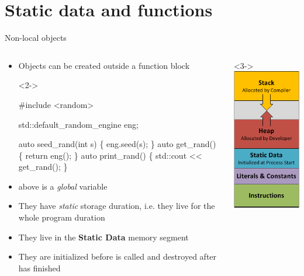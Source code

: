 

\section{Static data and functions}

\begin{frame}[fragile]{Non-local objects}

  \begin{columns}
    \begin{column}{.75\textwidth}
      \begin{itemize}
      \item Objects can be created outside a function block
        \begin{codeblock}<2->{
#include <random>

std::default_random_engine eng;

auto seed_rand(int s) \{ eng.seed(s); \}
auto get_rand()       \{ return eng(); \}
auto print_rand()     \{ std::cout << get_rand(); \}}\end{codeblock}

      \item<2->  above is a \textit{global} variable
      \item<3-> They have \textit{static} storage duration, i.e. they live for the
        whole program duration
      \item<3-> They live in the \textbf{Static Data} memory segment
      \item<4-> They are initialized before  is called and destroyed
        after  has finished
      \end{itemize}

    \end{column}
    \begin{column}{.25\textwidth}<3->
      \centering\includegraphics[height=.5\textheight]{images/process-memory-layout}
    \end{column}
  \end{columns}
\end{frame}

